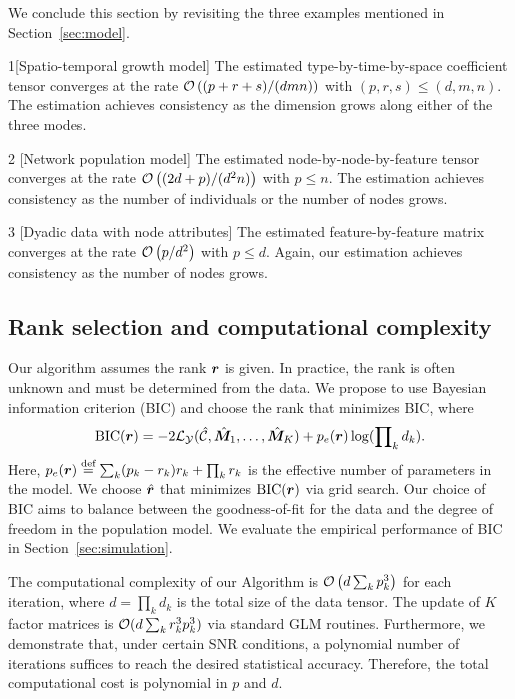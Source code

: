 \documentclass[12pt]{article}
\theoremstyle{definition}
\theoremstyle{definition}
\begin{document}
We conclude this section by revisiting the three examples mentioned in Section~\ref{sec:model}.

\begin{customexample}{1}[Spatio-temporal growth model] The estimated type-by-time-by-space coefficient tensor converges at the rate $\mathcal{O}\left((p+r+s)/(dmn)\right)$ with $(p,r,s)\leq (d,m,n)$. The estimation achieves consistency as the dimension grows along either of the three modes.
\end{customexample}

\begin{customexample}{2} [Network population model] The estimated node-by-node-by-feature tensor converges at the rate $\mathcal{O}\left((2d+p)/(d^2n)\right)$ with $p\leq n$. The estimation achieves consistency as the number of individuals or the number of nodes grows. 
\end{customexample}

\begin{customexample}{3} [Dyadic data with node attributes] The estimated feature-by-feature matrix converges at the rate $\mathcal{O}\left(p/d^2\right)$ with $p\leq d$. Again, our estimation achieves consistency as the number of nodes grows. 
\end{customexample}


\subsection{Rank selection and computational complexity}\label{sec:tuning}
Our algorithm assumes the rank $\bm{r}$ is given. In practice, the rank is often unknown and must be determined from the data. We propose to use Bayesian information criterion (BIC) and choose the rank that minimizes BIC, where
\begin{equation}\label{eq:BIC}
\textup{BIC}(\bm{r})=-2\mathcal{L}_{\mathcal{Y}}(\hat {\mathcal{C}}, \hat {\bm M}_1,\ldots,\hat {\bm M}_K)+p_e(\bm{r})\log (\prod\nolimits_k d_k).
\end{equation}
Here, $p_e(\bm{r})\stackrel{\textup{def}}{=}\sum_k (p_k-r_k)r_k+\prod_k r_k$ is the effective number of parameters in the model. We choose $\hat {\bm{r}}$ that minimizes $\textup{BIC}(\bm{r})$ via grid search. Our choice of BIC aims to balance between the goodness-of-fit for the data and the degree of freedom in the population model. We evaluate the empirical performance of BIC in Section~\ref{sec:simulation}.  

The computational complexity of our Algorithm is $\mathcal{O}\left(d \sum_k p^3_k\right)$ for each iteration, where $d=\prod_k d_k$ is the total size of the data tensor. The update of $K$ factor matrices is $\mathcal{O}(d\sum_k r^3_k p_k^3)$ via standard GLM routines. Furthermore, we demonstrate that, under certain SNR conditions, a polynomial number of iterations suffices to reach the desired statistical accuracy. Therefore, the total computational cost is polynomial in $p$ and $d$.
\end{document}
